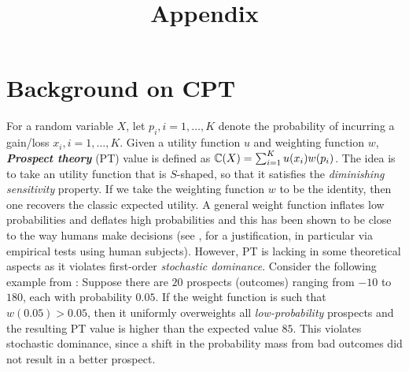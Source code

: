 \documentclass{article}
\numberwithin{equation}{section}
\numberwithin{theorem}{section}
\begin{document}
 
\onecolumn
\title{Appendix}
\date{}
\author{}
\maketitle
\vskip 0.3in


\appendix

 \setcounter{tocdepth}{1}
 \tableofcontents

 \newpage

\section{Background on CPT}
For a random variable $X$, let $p_i, i=1,\ldots,K$ denote the probability of incurring a gain/loss $x_i, i=1,\ldots,K$. %
Given a utility function $u$ and weighting function $w$, \textit{\textbf{Prospect theory}} (PT) value is defined as $\mathbb{C}(X) = \sum_{i=1}^K u(x_i) w(p_i)$. 
The idea is to take an utility function that is $S$-shaped, so that it satisfies the \textit{diminishing sensitivity}  property. 
If we take the weighting function $w$ to be the identity, then one recovers the classic expected utility. A general weight function inflates low probabilities and deflates high probabilities and this has been shown to be close to the way humans make decisions (see \cite{kahneman1979prospect}, \cite{fennema1997original} for a justification, in particular via empirical tests using human subjects).
However, PT is lacking in some theoretical aspects as it violates first-order \textit{stochastic dominance}. Consider the following example from \cite{fennema1997original}: Suppose there are $20$ prospects (outcomes) ranging from $-10$ to $180$, each with probability $0.05$. If the weight function is such that $w(0.05) > 0.05$, then it uniformly overweights all \textit{low-probability} prospects and the resulting PT value is higher than the expected value $85$. This violates stochastic dominance, since a shift in the probability mass from bad outcomes did not result in a better prospect. 
\end{document}
